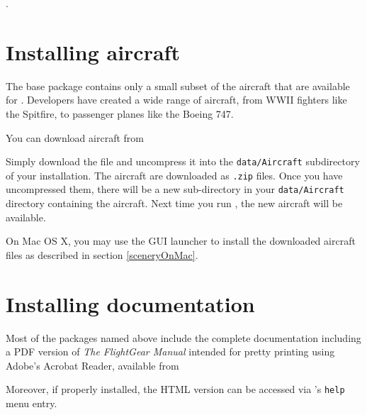 \medskip
{}.
\medskip

\section{Installing aircraft}\label{install_aircraft}

The base \FlightGear{} package contains only a small subset of the aircraft that are available for \FlightGear{}.
Developers have created a wide range of aircraft, from WWII fighters like the Spitfire, to passenger planes like the Boeing 747.

You can download aircraft from

\medskip
{}
\medskip

Simply download the file and uncompress it into the \texttt{data/Aircraft}
subdirectory of your installation. The aircraft are downloaded as \texttt{.zip}
files. Once you have uncompressed them, there will be a new sub-directory in your
\texttt{data/Aircraft} directory containing the aircraft. Next time you run
\FlightGear{}, the new aircraft will be available.

On Mac OS X, you may use the GUI launcher to install the downloaded aircraft files as described in section \ref{sceneryOnMac}.
 

\section{Installing documentation}

Most of the packages named above include the complete \FlightGear{}
documentation including a PDF version of \textit{The FlightGear
Manual} intended for pretty printing using Adobe's Acrobat Reader,
available from
\medskip

 \medskip

 \noindent
 Moreover, if properly installed, the HTML version can be accessed via
\FlightGear{}'s \texttt{help} menu entry.

